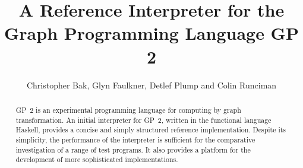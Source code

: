 \documentclass{eptcs}
\begin{document}
\title{A Reference Interpreter for the Graph Programming Language GP 2}

\author{Christopher Bak, Glyn Faulkner, Detlef Plump and Colin Runciman
}

\def\authorrunning{C. Bak, G. Faulkner, D. Plump \& C. Runciman} 
\def\titlerunning{A Reference Interpreter for GP~2}

\maketitle
\thispagestyle{empty}


\begin{abstract}
GP~2 is an experimental programming language
for computing by graph transformation.
An initial interpreter for GP~2, written
in the functional language Haskell, provides
a concise and simply structured reference
implementation.
Despite its simplicity, the performance of
the interpreter is sufficient for the
comparative investigation of a range of test
programs.
It also provides a platform for the development
of more sophisticated implementations.
\end{abstract}









{}

\end{document}

